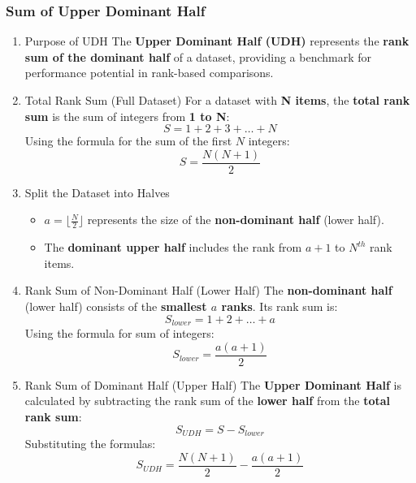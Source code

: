 \documentclass[man,floatsintext]{apa7}
\begin{document}
\subsubsection{Sum of Upper Dominant Half}
\begin{enumerate}
\item{Purpose of UDH}
The \textbf{Upper Dominant Half (UDH)} represents the \textbf{rank sum of the dominant half} of a dataset, providing a benchmark for performance potential in rank-based comparisons.

\item{Total Rank Sum (Full Dataset)}
For a dataset with \textbf{N items}, the \textbf{total rank sum} is the sum of integers from \textbf{1 to N}:
\begin{equation}
S = 1 + 2 + 3 + \ldots + N
\end{equation}
Using the formula for the sum of the first \( N \) integers:
\begin{equation}
S = \frac{N(N + 1)}{2}
\end{equation}

\item{Split the Dataset into Halves}
\begin{itemize}
  \item \( a = \lfloor \frac{N}{2} \rfloor \) represents the size of the \textbf{non-dominant half} (lower half).
  \item The \textbf{dominant upper half} includes the rank from \( a + 1 \) to \(N^{th}\) rank items.
\end{itemize}



\item{Rank Sum of Non-Dominant Half (Lower Half)}
The \textbf{non-dominant half} (lower half) consists of the \textbf{smallest \( a \) ranks}. Its rank sum is:
\begin{equation}
S_{lower} = 1 + 2 + \ldots + a
\end{equation}
Using the formula for sum of integers:
\begin{equation}
S_{lower} = \frac{a(a+1)}{2}
\end{equation}

\item{Rank Sum of Dominant Half (Upper Half)}
The \textbf{Upper Dominant Half} is calculated by subtracting the rank sum of the \textbf{lower half} from the \textbf{total rank sum}:
\begin{equation}
S_{UDH} = S - S_{lower}
\end{equation}
Substituting the formulas:
\begin{equation}
S_{UDH} = \frac{N(N + 1)}{2} - \frac{a(a+1)}{2}
\end{equation}


\end{enumerate}
\end{document}
